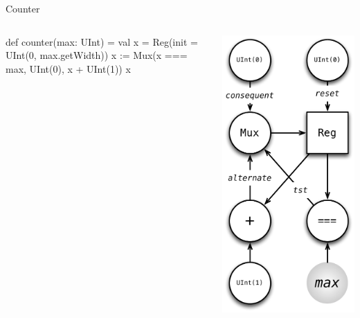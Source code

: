 \documentclass[xcolor=pdflatex,dvipsnames,table]{beamer}
\begin{document}
\begin{frame}[fragile]{Counter}

\begin{columns}

\begin{scala}
def counter(max: UInt) = {
  val x = Reg(init = UInt(0, max.getWidth))
  x := Mux(x === max, UInt(0), x + UInt(1))
  x
}
\end{scala}


\begin{center}
\includegraphics[height=0.9\textheight]{figs/counter.pdf} 
\end{center}

\end{columns}

\end{frame}
\end{document}
